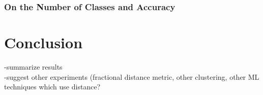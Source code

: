 \documentclass{article}
\begin{document}
\subsubsection{On the Number of Classes and Accuracy}

\section{Conclusion}
-summarize results\\
-suggest other experiments (fractional distance metric, other clustering, other ML techniques which use distance?
	


\end{document}
